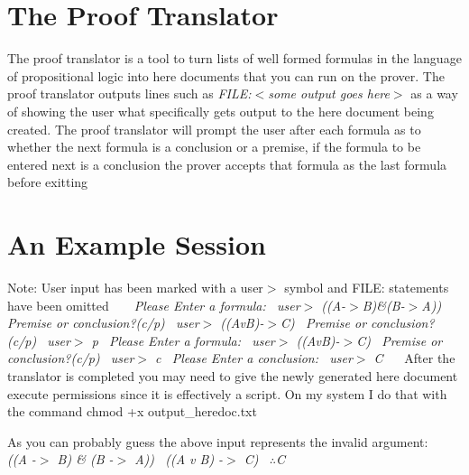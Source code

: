 \section*{The Proof Translator}

The proof translator is a tool to turn lists of well formed formulas in the language of propositional logic into here documents that you can run on the prover. The proof translator outputs lines such as {\itshape F\+I\+LE\+:$<$some output goes here$>$} as a way of showing the user what specifically gets output to the here document being created. The proof translator will prompt the user after each formula as to whether the next formula is a conclusion or a premise, if the formula to be entered next is a conclusion the prover accepts that formula as the last formula before exitting \section*{An Example Session}

Note\+: User input has been marked with a \textquotesingle{}user$>$\textquotesingle{} symbol and \textquotesingle{}F\+I\+LE\+:\textquotesingle{} statements have been omitted ~\newline
 ~\newline
 {\itshape  {\ttfamily  Please Enter a formula\+:~\newline
 user$>$ ((A-\/$>$B)\&(B-\/$>$A))~\newline
 Premise or conclusion?(c/p)~\newline
 user$>$ ((AvB)-\/$>$C)~\newline
 Premise or conclusion?(c/p)~\newline
 user$>$ p~\newline
 Please Enter a formula\+:~\newline
 user$>$ ((AvB)-\/$>$C)~\newline
 Premise or conclusion?(c/p)~\newline
 user$>$ c~\newline
 Please Enter a conclusion\+:~\newline
 user$>$ C~\newline
 } } ~\newline
 After the translator is completed you may need to give the newly generated here document execute permissions since it is effectively a script. On my system I do that with the command \textquotesingle{}chmod +x output\+\_\+heredoc.\+txt\textquotesingle{}

As you can probably guess the above input represents the invalid argument\+: ~\newline
 ~\newline
 {\itshape  {\ttfamily  ((A -\/$>$ B) \& (B -\/$>$ A))~\newline
 ((A v B) -\/$>$ C)~\newline
 {$\therefore$}C~\newline
 } }

